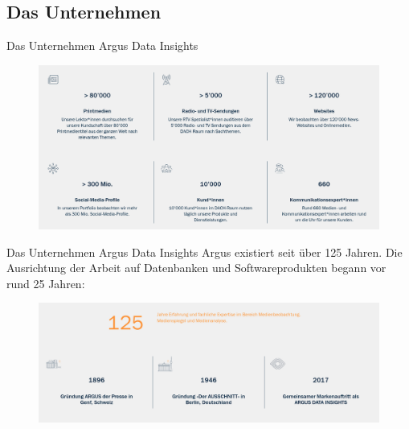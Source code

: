 \documentclass[toc]{beamer}
\begin{document}
    \subsection{Das Unternehmen}
        \begin{frame}{Das Unternehmen Argus Data Insights}
            \begin{figure}[htp]
                \centering
                \includegraphics[scale=0.23]{ArgusProfil.png}
            \end{figure}
        \end{frame} 
        
        \begin{frame}{Das Unternehmen Argus Data Insights}
            Argus existiert seit über 125 Jahren. Die Ausrichtung der Arbeit auf Datenbanken und Softwareprodukten begann vor rund 25 Jahren:
            \begin{figure}[htp]
                \includegraphics[width=\textwidth]{argusGeschichte.png}
            \end{figure}
        \end{frame}   
        
\end{document}
